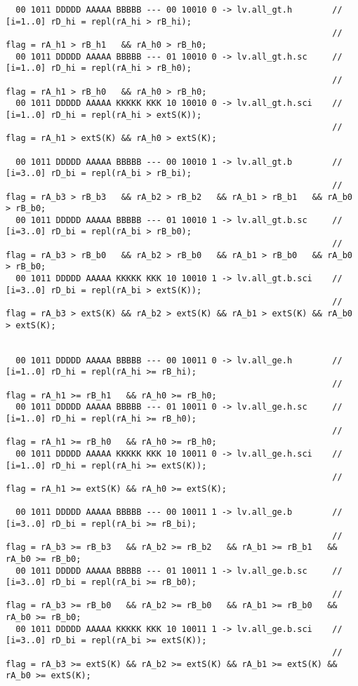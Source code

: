 \begin{landscape}
{\clearpage
\begin{verbatim}
  00 1011 DDDDD AAAAA BBBBB --- 00 10010 0 -> lv.all_gt.h        // [i=1..0] rD_hi = repl(rA_hi > rB_hi);    
                                                                 // flag = rA_h1 > rB_h1   && rA_h0 > rB_h0;
  00 1011 DDDDD AAAAA BBBBB --- 01 10010 0 -> lv.all_gt.h.sc     // [i=1..0] rD_hi = repl(rA_hi > rB_h0);    
                                                                 // flag = rA_h1 > rB_h0   && rA_h0 > rB_h0;
  00 1011 DDDDD AAAAA KKKKK KKK 10 10010 0 -> lv.all_gt.h.sci    // [i=1..0] rD_hi = repl(rA_hi > extS(K));  
                                                                 // flag = rA_h1 > extS(K) && rA_h0 > extS(K);

  00 1011 DDDDD AAAAA BBBBB --- 00 10010 1 -> lv.all_gt.b        // [i=3..0] rD_bi = repl(rA_bi > rB_bi);    
                                                                 // flag = rA_b3 > rB_b3   && rA_b2 > rB_b2   && rA_b1 > rB_b1   && rA_b0 > rB_b0;
  00 1011 DDDDD AAAAA BBBBB --- 01 10010 1 -> lv.all_gt.b.sc     // [i=3..0] rD_bi = repl(rA_bi > rB_b0);    
                                                                 // flag = rA_b3 > rB_b0   && rA_b2 > rB_b0   && rA_b1 > rB_b0   && rA_b0 > rB_b0;
  00 1011 DDDDD AAAAA KKKKK KKK 10 10010 1 -> lv.all_gt.b.sci    // [i=3..0] rD_bi = repl(rA_bi > extS(K));  
                                                                 // flag = rA_b3 > extS(K) && rA_b2 > extS(K) && rA_b1 > extS(K) && rA_b0 > extS(K);


  00 1011 DDDDD AAAAA BBBBB --- 00 10011 0 -> lv.all_ge.h        // [i=1..0] rD_hi = repl(rA_hi >= rB_hi);   
                                                                 // flag = rA_h1 >= rB_h1   && rA_h0 >= rB_h0;
  00 1011 DDDDD AAAAA BBBBB --- 01 10011 0 -> lv.all_ge.h.sc     // [i=1..0] rD_hi = repl(rA_hi >= rB_h0);   
                                                                 // flag = rA_h1 >= rB_h0   && rA_h0 >= rB_h0;
  00 1011 DDDDD AAAAA KKKKK KKK 10 10011 0 -> lv.all_ge.h.sci    // [i=1..0] rD_hi = repl(rA_hi >= extS(K)); 
                                                                 // flag = rA_h1 >= extS(K) && rA_h0 >= extS(K);

  00 1011 DDDDD AAAAA BBBBB --- 00 10011 1 -> lv.all_ge.b        // [i=3..0] rD_bi = repl(rA_bi >= rB_bi);   
                                                                 // flag = rA_b3 >= rB_b3   && rA_b2 >= rB_b2   && rA_b1 >= rB_b1   && rA_b0 >= rB_b0;
  00 1011 DDDDD AAAAA BBBBB --- 01 10011 1 -> lv.all_ge.b.sc     // [i=3..0] rD_bi = repl(rA_bi >= rB_b0);   
                                                                 // flag = rA_b3 >= rB_b0   && rA_b2 >= rB_b0   && rA_b1 >= rB_b0   && rA_b0 >= rB_b0;
  00 1011 DDDDD AAAAA KKKKK KKK 10 10011 1 -> lv.all_ge.b.sci    // [i=3..0] rD_bi = repl(rA_bi >= extS(K)); 
                                                                 // flag = rA_b3 >= extS(K) && rA_b2 >= extS(K) && rA_b1 >= extS(K) && rA_b0 >= extS(K);
\end{verbatim}

}
\end{landscape}
